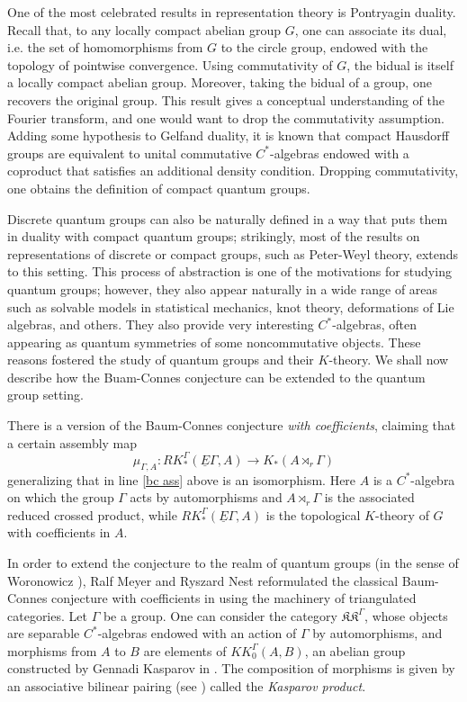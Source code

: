 One of the most celebrated results in representation theory is Pontryagin duality. Recall that, to any locally compact abelian group $G$, one can associate its dual, i.e. the set of homomorphisms from $G$ to the circle group, endowed with the topology of pointwise convergence. Using commutativity of $G$, the bidual is itself a locally compact abelian group. Moreover, taking the bidual of a group, one recovers the original group. This result gives a conceptual understanding of the Fourier transform, and one would want to drop the commutativity assumption. 
Adding some hypothesis to Gelfand duality, it is known that compact Hausdorff groups are equivalent to unital commutative $C^*$-algebras endowed with a coproduct that satisfies an additional density condition. Dropping commutativity, one obtains the definition of compact quantum groups. 

Discrete quantum groups can also be naturally defined in a way that puts them in duality with compact quantum groups; strikingly, most of the results on representations of discrete or compact groups, such as Peter-Weyl theory, extends to this setting. This process of abstraction is one of the motivations for studying quantum groups; however, they also appear naturally in a wide range of areas such as solvable models in statistical mechanics, knot theory, deformations of Lie algebras, and others. They also provide very interesting $C^*$-algebras, often appearing as quantum symmetries of some noncommutative objects. These reasons fostered the study of quantum groups and their $K$-theory. We shall now describe how the Buam-Connes conjecture can be extended to the quantum group setting.      

There is a version of the Baum-Connes conjecture \emph{with coefficients}, claiming that a certain assembly map 
\begin{equation}\label{bcc}
\mu_{\Gamma,A}: RK^\Gamma_*(\underline{E}\Gamma,A) \rightarrow K_*(A\rtimes_r \Gamma)
\end{equation}
generalizing that in line \eqref{bc ass} above is an isomorphism.  Here $A$ is a $C^*$-algebra on which the group $\Gamma$ acts by automorphisms and $A\rtimes_r \Gamma$ is the associated reduced crossed product, while $RK^\Gamma_*(\underline{E}\Gamma,A)$ is the topological $K$-theory of $G$ with coefficients in $A$.

In order to extend the conjecture to the realm of quantum groups (in the sense of Woronowicz \cite{Wo}), Ralf Meyer and Ryszard Nest reformulated the classical Baum-Connes conjecture with coefficients in \cite{MeyerNest} using the machinery of triangulated categories. Let $\Gamma$ be a group. One can consider the category $\mathfrak{KK}^\Gamma$, whose objects are separable $C^*$-algebras endowed with an action of $\Gamma$ by automorphisms, and morphisms from $A$ to $B$ are elements of $KK_0^\Gamma(A,B)$, an abelian group constructed by Gennadi Kasparov in \cite{Kasparov}. The composition of morphisms is given by an associative bilinear pairing (see \cite{Kasparov}) called the \emph{Kasparov product}.


